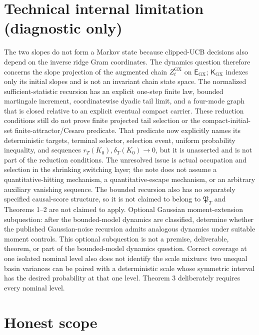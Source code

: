 \documentclass{article}
\begin{document}
\section*{Technical internal limitation (diagnostic only)}

The two slopes do not form a Markov state because clipped-UCB decisions also depend on the inverse ridge Gram coordinates. The dynamics question therefore concerns the slope projection of the augmented chain \(Z^{\mathrm{GX}}_t\) on \(\mathsf E_{\mathrm{GX}}\); \(\mathsf K_{\mathrm{GX}}\) indexes only its initial slopes and is not an invariant chain state space. The normalized sufficient-statistic recursion has an explicit one-step finite law, bounded martingale increment, coordinatewise dyadic tail limit, and a four-mode graph that is closed relative to an explicit eventual compact carrier. These reduction conditions still do not prove finite projected tail selection or the compact-initial-set finite-attractor/Cesaro predicate. That predicate now explicitly names its deterministic targets, terminal selector, selection event, uniform probability inequality, and sequences \(r_T(K_0),\delta_T(K_0)\to0\), but it is unasserted and is not part of the reduction conditions. The unresolved issue is actual occupation and selection in the shrinking switching layer; the note does not assume a quantitative-hitting mechanism, a quantitative-escape mechanism, or an arbitrary auxiliary vanishing sequence. The bounded recursion also has no separately specified causal-score structure, so it is not claimed to belong to \(\mathfrak P_T\) and Theorems 1--2 are not claimed to apply. Optional Gaussian moment-extension subquestion: after the bounded-model dynamics are classified, determine whether the published Gaussian-noise recursion admits analogous dynamics under suitable moment controls. This optional subquestion is not a premise, deliverable, theorem, or part of the bounded-model dynamics question. Correct coverage at one isolated nominal level also does not identify the scale mixture: two unequal basin variances can be paired with a deterministic scale whose symmetric interval has the desired probability at that one level. Theorem 3 deliberately requires every nominal level.

\section{Honest scope}
\end{document}
